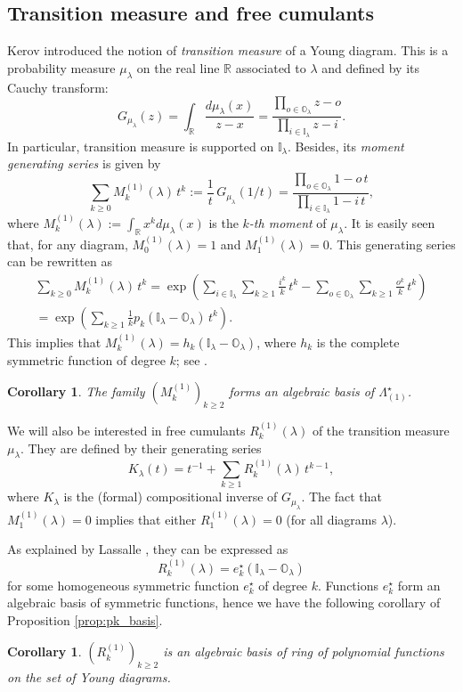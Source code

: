 \documentclass[11pt]{amsart}
\theoremstyle{plain}
\newtheorem{corollary}[lemma]{Corollary}
\theoremstyle{remark}
\newcommand{\RR}{\mathbb{R}}
\newcommand{\II}{\mathbb{I}}
\newcommand{\OO}{\mathbb{O}}
\begin{document}
\subsection{Transition measure and free cumulants}
\label{subsect:TransMeasure}
Kerov \cite{KerovTransitionMeasure} introduced the notion
of \emph{transition measure} of a Young diagram.
This is a probability measure $\mu_\lambda$ on the real line $\RR$ associated to $\lambda$
and defined by its Cauchy transform:
\[G_{\mu_\lambda}(z) = \int_\RR \frac{d\mu_\lambda(x)}{z-x} =
\frac{\prod_{o \in \OO_\lambda} z-o}{\prod_{i \in \II_\lambda} z-i}.\]
In particular, transition measure is supported on $\II_\lambda$.
Besides, its \emph{moment generating series} is given by
\[ \sum_{k \ge 0} M^{(1)}_k(\lambda) \, t^k := \frac{1}{t} \, G_{\mu_\lambda}(1/t)
=\frac{\prod_{o \in \OO_\lambda} 1-o\, t}{\prod_{i \in \II_\lambda} 1-i\, t}, \]
where $M^{(1)}_k(\lambda):= \int_\RR x^k d\mu_\lambda(x)$ is the \emph{$k$-th moment} of
$\mu_\lambda$.
It is easily seen that, for any diagram, $M^{(1)}_0(\lambda)=1$ and $M^{(1)}_1(\lambda)=0$.
This generating series can be rewritten as
\begin{multline*}
    \sum_{k \ge 0} M^{(1)}_k(\lambda) \, t^k = \exp\left( \sum_{i \in \II_\lambda}\sum_{k \ge 1}
\frac{i^k}{k}\, t^k - \sum_{o \in \OO_\lambda}\sum_{k \ge 1} \frac{o^k}{k}\, t^k \right) \\
= \exp \left( \sum_{k \ge 1} \frac{1}{k} p_k(\II_\lambda -\OO_\lambda)\, t^k \right).
\end{multline*}
This implies that $M^{(1)}_k(\lambda)=h_k(\II_\lambda -\OO_\lambda)$,
where $h_k$ is the complete symmetric function of degree $k$;
see \cite[page 25]{Macdonald1995}.
\begin{corollary}
    The family $(M^{(1)}_k)_{k \geq 2}$ forms an algebraic basis of $\Lambda_{(1)}^\star$.
\end{corollary}

We will also be interested in free cumulants $R^{(1)}_k(\lambda)$
of the transition measure $\mu_\lambda$.
They are defined by their generating series
\[K_\lambda(t) =t^{-1} + \sum_{k \ge 1} R^{(1)}_k(\lambda) \, t^{k-1},\]
where $K_\lambda$ is the (formal) compositional inverse of $G_{\mu_\lambda}$.
The fact that $M^{(1)}_1(\lambda)=0$ implies that either $R^{(1)}_1(\lambda)=0$ 
(for all diagrams $\lambda$).

As explained by Lassalle \cite[Section 5]{Lassalle2009},
they can be expressed as
\begin{equation}
\label{eq:FreeCumulantsLassalle}
R^{(1)}_k(\lambda) = e_k^\star(\II_\lambda -\OO_\lambda)
\end{equation}
for some homogeneous symmetric function $e_k^\star$ of degree $k$.
Functions $e_k^\star$ form an algebraic basis of symmetric functions, hence
we have the following corollary of Proposition \ref{prop:pk_basis}.
\begin{corollary}
$(R^{(1)}_k)_{k \geq 2}$ is an algebraic basis of ring of polynomial functions
on the set of Young diagrams.
\end{corollary}
\end{document}
